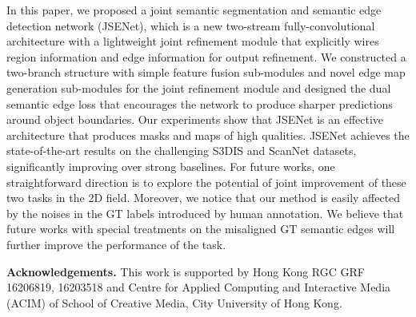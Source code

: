 \documentclass[runningheads]{llncs}
\begin{document}
In this paper, we propose{d} a joint semantic segmentation and semantic edge detection network (JSENet), which is a new two-stream fully-convolutional architecture with a lightweight joint refinement module that explicitly wires region information and edge information for output refinement. 
{We constructed a two-branch structure with simple feature fusion sub-modules and novel edge map generation sub-modules for the joint refinement module and designed the dual semantic edge loss that encourages the network to produce sharper predictions around object boundaries.}
Our experiments show that JSENet is an effective architecture that produces {\SemSegPoint} masks and {\SemEdgePoint} maps of high qualities. 
JSENet achieves the state-of-the-art results on the challenging S3DIS and ScanNet dataset{s}, significantly improving over strong baselines. For future works, one straightforward direction is to explore the potential of joint improvement of these two tasks in the 2D field. Moreover, we notice that our  {\SemEdgeD} method is easily affected by the noises in the GT labels introduced by human annotation. We believe that future works with special treatments on the misaligned GT semantic edges will further improve the performance of the {\SemEdgeD} task.

\noindent\textbf{Acknowledgements.} This work is supported by Hong Kong RGC GRF 16206819, 16203518 and Centre for Applied Computing and Interactive Media (ACIM) of School of Creative Media, City University of Hong Kong.

%
 
\end{document}
